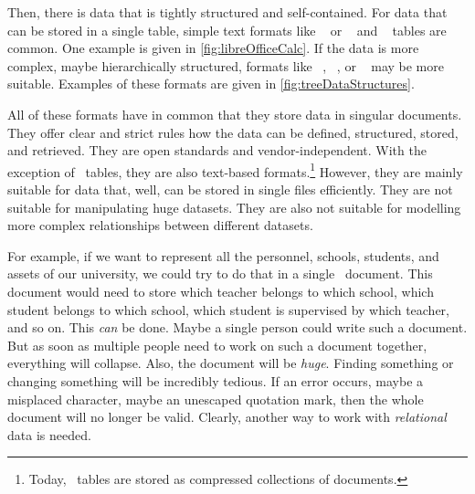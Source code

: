 Then, there is data that is tightly structured and self-contained.
For data that can be stored in a single table, simple text formats like ~\cite{RFC4180} or \microsoftExcel~\cite{B2023DMWME,G2024ECRFMME} and \libreofficeCalc~\cite{S2022L7PFEUU,DF2024LTDF} tables are common.
One example is given in \cref{fig:libreOfficeCalc}.
If the data is more complex, maybe hierarchically structured, formats like ~\cite{BPSMM2008EMLX1FE,K2019ITXJY,CH2013XFCAMLTMC}, ~\cite{E2017SE4TJDIS,RFC8259}, or ~\cite{DNMAASBE2021YAMLYV1,K2019ITXJY,CGTYB2022YFFDCAIE} may be more suitable.
Examples of these formats are given in \cref{fig:treeDataStructures}.

All of these formats have in common that they store data in singular documents.
They offer clear and strict rules how the data can be defined, structured, stored, and retrieved.
They are open standards and vendor-independent.
With the exception of \microsoftExcel\ tables, they are also text-based formats.\footnote{%
Today, \microsoftExcel\ tables are stored as compressed collections of  documents.%
} %
However, they are mainly suitable for data that, well, can be stored in single files efficiently.
They are not suitable for manipulating huge datasets.
They are also not suitable for modelling more complex relationships between different datasets.

For example, if we want to represent all the personnel, schools, students, and assets of our university, we could try to do that in a single ~document.
This document would need to store which teacher belongs to which school, which student belongs to which school, which student is supervised by which teacher, and so on.
This \emph{can} be done.
Maybe a single person could write such a document.
But as soon as multiple people need to work on such a document together, everything will collapse.
Also, the document will be \emph{huge}.
Finding something or changing something will be incredibly tedious.
If an error occurs, maybe a misplaced character, maybe an unescaped quotation mark, then the whole document will no longer be valid.
Clearly, another way to work with \emph{relational} data is needed.
